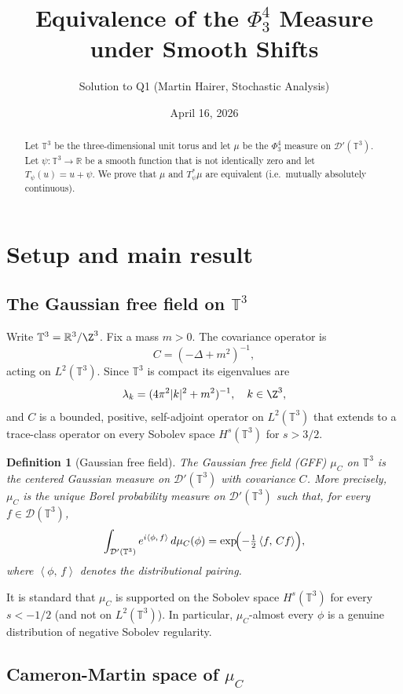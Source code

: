 \documentclass[12pt]{article}
\title{Equivalence of the $\Phi^4_3$ Measure under Smooth Shifts}
\author{Solution to Q1 (Martin Hairer, Stochastic Analysis)}
\date{April 16, 2026}
\newtheorem{definition}[theorem]{Definition}
\newcommand{\T}{\mathbb{T}}
\newcommand{\R}{\mathbb{R}}
\newcommand{\Dc}{\mathcal{D}}
\newcommand{\ip}[2]{\left\langle #1,\, #2 \right\rangle}
\begin{document}
\maketitle

\begin{abstract}
Let $\T^3$ be the three-dimensional unit torus and let $\mu$ be the $\Phi^4_3$ measure on
$\Dc'(\T^3)$.  Let $\psi:\T^3\to\R$ be a smooth function that is not identically zero and let
$T_\psi(u)=u+\psi$.  We prove that $\mu$ and $T_\psi^*\mu$ are equivalent (i.e.\ mutually
absolutely continuous).
\end{abstract}

\tableofcontents

\section{Setup and main result}

\subsection{The Gaussian free field on $\T^3$}

Write $\T^3 = \R^3/\Z^3$.  Fix a mass $m>0$.  The covariance operator is
\[
  C = (-\Delta + m^2)^{-1},
\]
acting on $L^2(\T^3)$.  Since $\T^3$ is compact its eigenvalues are
\[
  \lambda_k = (4\pi^2|k|^2 + m^2)^{-1}, \quad k\in\Z^3,
\]
and $C$ is a bounded, positive, self-adjoint operator on $L^2(\T^3)$ that
extends to a trace-class operator on every Sobolev space $H^s(\T^3)$ for
$s> 3/2$.

\begin{definition}[Gaussian free field]\label{def:GFF}
The \emph{Gaussian free field} (GFF) $\mu_C$ on $\T^3$ is the centered Gaussian measure on
$\Dc'(\T^3)$ with covariance $C$.  More precisely, $\mu_C$ is the unique Borel probability
measure on $\Dc'(\T^3)$ such that, for every $f\in\Dc(\T^3)$,
\[
  \int_{\Dc'(\T^3)} e^{i\ip{\phi}{f}}\,d\mu_C(\phi)
  = \exp\!\Bigl(-\tfrac{1}{2}\ip{f}{Cf}\Bigr),
\]
where $\ip{\phi}{f}$ denotes the distributional pairing.
\end{definition}

It is standard that $\mu_C$ is supported on the Sobolev space $H^s(\T^3)$ for every
$s < -1/2$ (and not on $L^2(\T^3)$).  In particular, $\mu_C$-almost every $\phi$ is a
genuine distribution of negative Sobolev regularity.

\subsection{Cameron-Martin space of $\mu_C$}
\end{document}
